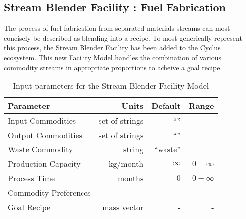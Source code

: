 \subsection{Stream Blender Facility : Fuel Fabrication}

The process of fuel fabrication from separated materials streams can most
concisely be described as blending into a recipe. To most generically represent
this process, the Stream Blender Facility has been added to the Cyclus 
ecosystem.  This new Facility Model handles the combination of various 
commodity streams in appropriate proportions to acheive a goal recipe.  

\begin{table}[h!]
\centering
\begin{tabular}{|l|r|r|r|}
\hline
\textbf{Parameter} & \textbf{Units} & \textbf{Default} & \textbf{Range}\\
\hline
Input Commodities & set of strings& ``''& \\
Output Commodities & set of strings&``'' & \\
Waste Commodity & string & ``waste'' & \\
Production Capacity& kg/month& $\infty$& $0-\infty$\\
Process Time& months & $0$ & $0-\infty$ \\
Commodity Preferences& - & - & - \\
Goal Recipe& mass vector & - & -  \\
\hline
\end{tabular}
\caption{Input parameters for the Stream Blender Facility Model}
\label{tab:commodconverter}
\end{table}
